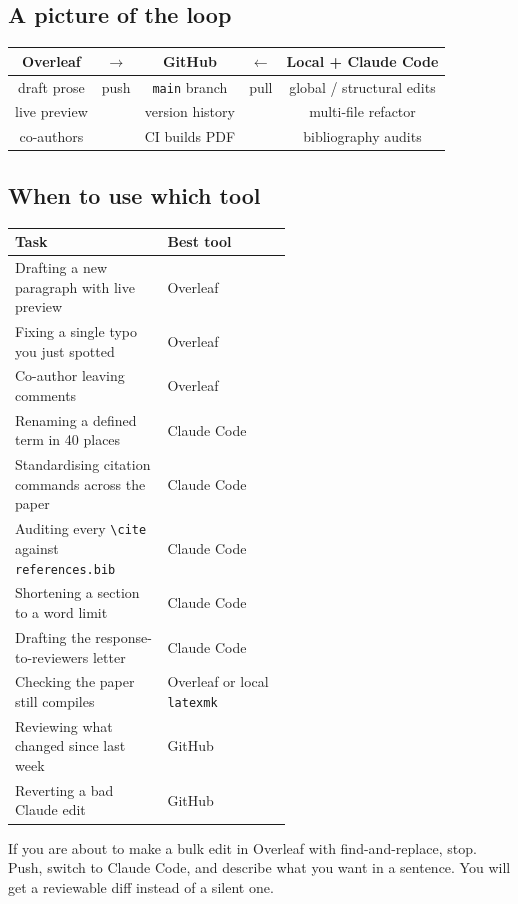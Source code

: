 \subsection{A picture of the loop}

\begin{center}
\begin{tabular}{c c c c c}
\toprule
Overleaf & $\longrightarrow$ & GitHub & $\longleftarrow$ & Local + Claude Code \\
\midrule
draft prose     & push & \verb|main| branch & pull & global / structural edits \\
live preview    &      & version history    &      & multi-file refactor \\
co-authors      &      & CI builds PDF      &      & bibliography audits \\
\bottomrule
\end{tabular}
\end{center}

\subsection{When to use which tool}

\begin{center}
\begin{tabular}{p{0.55\linewidth} l}
\toprule
\textbf{Task} & \textbf{Best tool} \\
\midrule
Drafting a new paragraph with live preview             & Overleaf \\
Fixing a single typo you just spotted                  & Overleaf \\
Co-author leaving comments                             & Overleaf \\
Renaming a defined term in 40 places                   & Claude Code \\
Standardising citation commands across the paper       & Claude Code \\
Auditing every \verb|\cite| against \verb|references.bib| & Claude Code \\
Shortening a section to a word limit                   & Claude Code \\
Drafting the response-to-reviewers letter              & Claude Code \\
Checking the paper still compiles                      & Overleaf or local \verb|latexmk| \\
Reviewing what changed since last week                 & GitHub \\
Reverting a bad Claude edit                            & GitHub \\
\bottomrule
\end{tabular}
\end{center}

\begin{tipbox}
If you are about to make a bulk edit in Overleaf with find-and-replace, stop. Push, switch to Claude Code, and describe what you want in a sentence. You will get a reviewable diff instead of a silent one.
\end{tipbox}
